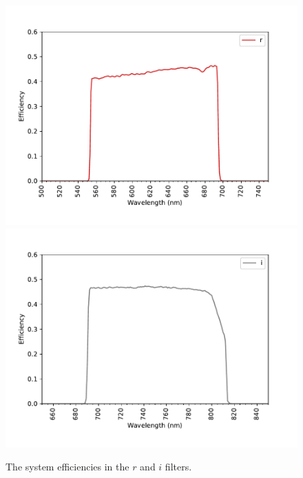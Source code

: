 \begin{figure}
\centering
\includegraphics[width=0.80\linewidth]{figure/system-r.pdf}
\includegraphics[width=0.80\linewidth]{figure/system-i.pdf}
\caption{The system efficiencies in the $r$ and $i$ filters.}
\end{figure}

